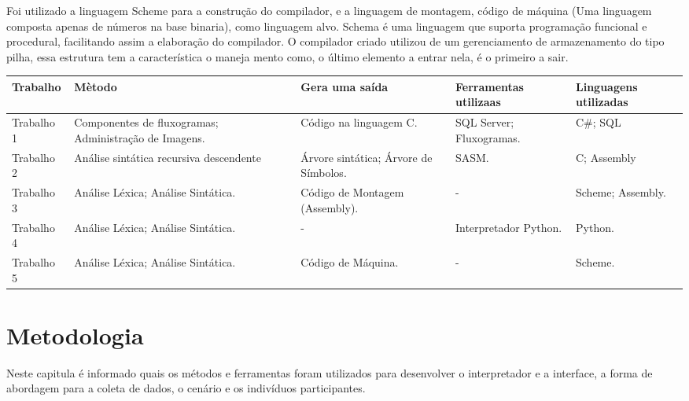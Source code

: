 \documentclass[12pt,oneside,a4paper,chapter=TITLE,section=TITLE,sumario=tradicional]{abntex2}
\begin{document}
Foi utilizado a linguagem Scheme para a construção do compilador, e a linguagem de montagem, código de máquina (Uma linguagem composta apenas de números na base binaria), como linguagem alvo. Schema é uma linguagem que suporta programação funcional e procedural, facilitando assim a elaboração do compilador. O compilador criado utilizou de um gerenciamento de armazenamento do tipo pilha, essa estrutura tem a característica o maneja mento como, o último elemento a entrar nela, é o primeiro a sair.

\begin{quadro}[htb]
    \centering
    \vspace{0.5cm}
    \begin{tabular}{|p{3.0cm}|p{3.0cm}|p{3.0cm}|p{3.0cm}|p{3.0cm}|}
        \hline
        \textbf{Trabalho} & \textbf{Mètodo} & \textbf{Gera uma saída} & \textbf{Ferramentas utilizaas} & \textbf{Linguagens utilizadas} \\ 
        \hline\hline
        Trabalho 1 & Componentes de fluxogramas; Administração de Imagens. & Código na linguagem C.   &  SQL Server; Fluxogramas. & C\#; SQL    \\ \hline 
        Trabalho 2 & Análise sintática recursiva descendente    & Árvore sintática; Árvore de Símbolos.   & SASM.  & C; Assembly  \\ \hline
        Trabalho 3 & Análise Léxica; Análise Sintática.   & Código de Montagem (Assembly).  &  -  & Scheme; Assembly.  \\ \hline
        Trabalho 4 & Análise Léxica; Análise Sintática.   & -   &  Interpretador Python.  & Python.   \\ \hline
        Trabalho 5 & Análise Léxica; Análise Sintática.   &  Código de Máquina.   & -   & Scheme.   \\ \hline
    \end{tabular}

    
\end{quadro}



\chapter{Metodologia}
\label{cap:metodologia}

Neste capitula é informado quais os métodos e ferramentas foram utilizados para desenvolver o interpretador e a interface, a forma de abordagem para a coleta de dados, o cenário e os indivíduos participantes.
\end{document}
